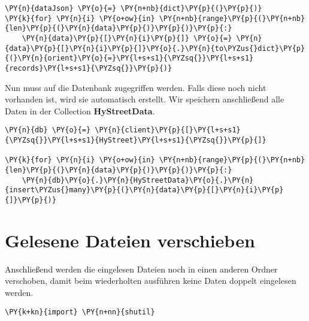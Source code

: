     \begin{tcolorbox}[breakable, size=fbox, boxrule=1pt, pad at break*=1mm,colback=cellbackground, colframe=cellborder]
\begin{Verbatim}[commandchars=\\\{\}]
\PY{n}{dataJson} \PY{o}{=} \PY{n+nb}{dict}\PY{p}{(}\PY{p}{)}
\PY{k}{for} \PY{n}{i} \PY{o+ow}{in} \PY{n+nb}{range}\PY{p}{(}\PY{n+nb}{len}\PY{p}{(}\PY{n}{data}\PY{p}{)}\PY{p}{)}\PY{p}{:}
    \PY{n}{data}\PY{p}{[}\PY{n}{i}\PY{p}{]} \PY{o}{=} \PY{n}{data}\PY{p}{[}\PY{n}{i}\PY{p}{]}\PY{o}{.}\PY{n}{to\PYZus{}dict}\PY{p}{(}\PY{n}{orient}\PY{o}{=}\PY{l+s+s1}{\PYZsq{}}\PY{l+s+s1}{records}\PY{l+s+s1}{\PYZsq{}}\PY{p}{)}
\end{Verbatim}
\end{tcolorbox}

    Nun muss auf die Datenbank zugegriffen werden. Falls diese noch nicht
vorhanden ist, wird sie automatisch erstellt. Wir speichern anschließend
alle Daten in der Collection \textbf{HyStreetData}.

    \begin{tcolorbox}[breakable, size=fbox, boxrule=1pt, pad at break*=1mm,colback=cellbackground, colframe=cellborder]
\begin{Verbatim}[commandchars=\\\{\}]
\PY{n}{db} \PY{o}{=} \PY{n}{client}\PY{p}{[}\PY{l+s+s1}{\PYZsq{}}\PY{l+s+s1}{HyStreet}\PY{l+s+s1}{\PYZsq{}}\PY{p}{]}

\PY{k}{for} \PY{n}{i} \PY{o+ow}{in} \PY{n+nb}{range}\PY{p}{(}\PY{n+nb}{len}\PY{p}{(}\PY{n}{data}\PY{p}{)}\PY{p}{)}\PY{p}{:}
    \PY{n}{db}\PY{o}{.}\PY{n}{HyStreetData}\PY{o}{.}\PY{n}{insert\PYZus{}many}\PY{p}{(}\PY{n}{data}\PY{p}{[}\PY{n}{i}\PY{p}{]}\PY{p}{)}
\end{Verbatim}
\end{tcolorbox}

    \hypertarget{gelesene-dateien-verschieben}{%
\section{Gelesene Dateien
verschieben}\label{gelesene-dateien-verschieben}}

    Anschließend werden die eingelesen Dateien noch in einen anderen Ordner
verschoben, damit beim wiederholten ausführen keine Daten doppelt
eingelesen werden.

    \begin{tcolorbox}[breakable, size=fbox, boxrule=1pt, pad at break*=1mm,colback=cellbackground, colframe=cellborder]
\begin{Verbatim}[commandchars=\\\{\}]
\PY{k+kn}{import} \PY{n+nn}{shutil}
\end{Verbatim}
\end{tcolorbox}

